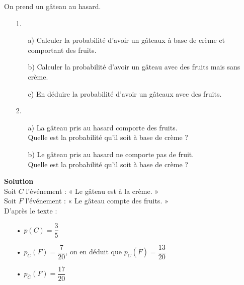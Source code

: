\vspace*{.3cm}

On prend un gâteau au hasard. \\

\begin{itemize}
\item[1.]
\begin{itemize}
\item[a)] Calculer la probabilité d'avoir un gâteaux à base de crème et comportant des fruits. 
\item[b)] Calculer la probabilité d'avoir un gâteau avec des fruits mais sans crème.
\item[c)] En déduire la probabilité d'avoir un gâteaux avec des fruits. \\
\end{itemize}
\item[2.]
\begin{itemize}
\item[a)] La gâteau pris au hasard comporte des fruits.\\ Quelle est la probabilité qu'il soit à base de crème ?
\item[b)] Le gâteau pris au hasard ne comporte pas de fruit. \\ Quelle est la probabilité qu'il soit à base de crème ?
\end{itemize}
\end{itemize}

\vspace*{.3cm}

\textbf{Solution} \\

Soit $C$ l'événement : « Le gâteau est à la crème. » \\
Soit $F$ l'événement : « Le gâteau compte des fruits. » \\

D'après le texte : \\

\begin{itemize}
\item[•] $p\left(C\right) = \dfrac{3}{5}$ \vspace*{.3cm} \\
\item[•] $p_C\left(F\right) = \dfrac{7}{20}$, on en déduit que $p_C\left(\overline{F}\right) = \dfrac{13}{20}$ \vspace*{.3cm} \\
\item[•] $p_{\overline{C}}\left(F\right) = \dfrac{17}{20}$ \vspace*{.3cm} \\
\end{itemize}


